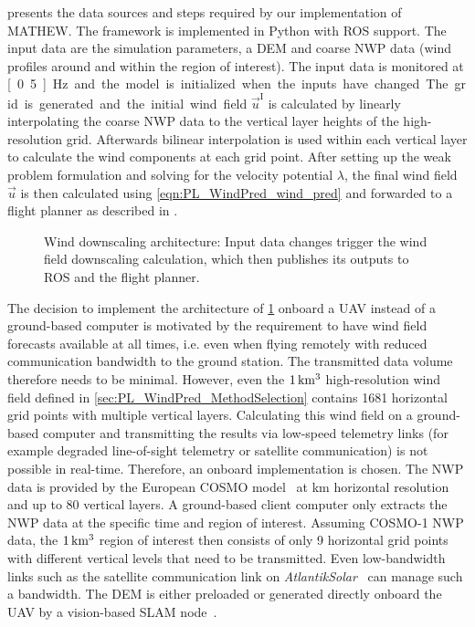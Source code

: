 \documentclass[twocolumn,letterpaper]{IEEEAerospaceCLS}
\begin{document}
 presents the data sources and steps required by our implementation of MATHEW. The framework is implemented in Python with \ac{ROS} support. The input data are the simulation parameters, a \ac{DEM} and coarse \ac{NWP} data (wind profiles around and within the region of interest). The input data is monitored at \unit[0.5]{Hz} and the model is initialized when the inputs have changed. The grid is generated and the initial wind field $\vec{u}^\text{I}$ is calculated by linearly interpolating the coarse \ac{NWP} data to the vertical layer heights of the high-resolution grid. Afterwards bilinear interpolation is used within each vertical layer to calculate the wind components at each grid point. After setting up the weak problem formulation and solving for the velocity potential $\lambda$, the final wind field $\vec{u}$ is then calculated using \cref{eqn:PL_WindPred_wind_pred} and forwarded to a flight planner as described in \cite{Oettershagen2018RealTimePlanning}.

\begin{figure}[htb]
\centering

\caption[Architecture and interfaces]{Wind downscaling architecture: Input data changes trigger the wind field downscaling calculation, which then publishes its outputs to \ac{ROS} and the flight planner.}
\label{fig:PL_WindPred_Impl_Architecture}
\end{figure}

The decision to implement the architecture of \cref{fig:PL_WindPred_Impl_Architecture} onboard a \ac{UAV} instead of a ground-based computer is motivated by the requirement to have wind field forecasts available at all times, i.e. even when flying remotely with reduced communication bandwidth to the ground station. The transmitted data volume therefore needs to be minimal. However, even the $\unit[1]{km^3}$ high-resolution wind field defined in \cref{sec:PL_WindPred_MethodSelection} contains 1681 horizontal grid points with multiple vertical layers. Calculating this wind field on a ground-based computer and transmitting the results via low-speed telemetry links (for example degraded line-of-sight telemetry or satellite communication) is not possible in real-time. Therefore, an onboard implementation is chosen. The NWP data is provided by the European \ac{COSMO} model~\cite{COSMOMeteoSwiss} at \unit[1--7]{km} horizontal resolution and up to 80 vertical layers. A ground-based client computer only extracts the \ac{NWP} data at the specific time and region of interest. Assuming COSMO-1 \ac{NWP} data, the $\unit[1]{km^3}$ region of interest then consists of only 9 horizontal grid points with different vertical levels that need to be transmitted. Even low-bandwidth links such as the satellite communication link on \emph{AtlantikSolar}~\cite{Oettershagen_JFR2017} can manage such a bandwidth. The \ac{DEM} is either preloaded or generated directly onboard the \ac{UAV} by a vision-based \ac{SLAM} node~\cite{Hinzmann2016}.
\end{document}
